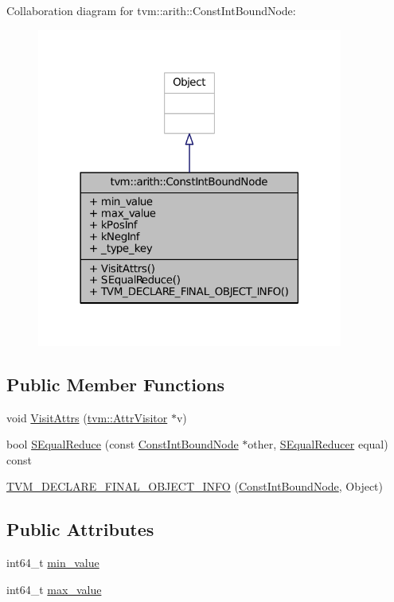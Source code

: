 Collaboration diagram for tvm\+:\+:arith\+:\+:Const\+Int\+Bound\+Node\+:
\nopagebreak
\begin{figure}[H]
\begin{center}
\leavevmode
\includegraphics[width=285pt]{classtvm_1_1arith_1_1ConstIntBoundNode__coll__graph}
\end{center}
\end{figure}
\subsection*{Public Member Functions}
\begin{DoxyCompactItemize}
\item 
void \hyperlink{classtvm_1_1arith_1_1ConstIntBoundNode_ac3b75966532b9fa16d96df991f33076f}{Visit\+Attrs} (\hyperlink{classtvm_1_1AttrVisitor}{tvm\+::\+Attr\+Visitor} $\ast$v)
\item 
bool \hyperlink{classtvm_1_1arith_1_1ConstIntBoundNode_a0d39b4e097e1e0e4fffd85d3d2b22459}{S\+Equal\+Reduce} (const \hyperlink{classtvm_1_1arith_1_1ConstIntBoundNode}{Const\+Int\+Bound\+Node} $\ast$other, \hyperlink{classtvm_1_1SEqualReducer}{S\+Equal\+Reducer} equal) const 
\item 
\hyperlink{classtvm_1_1arith_1_1ConstIntBoundNode_a79d78aaf1f1c3e974a3fbe4f4875e8ee}{T\+V\+M\+\_\+\+D\+E\+C\+L\+A\+R\+E\+\_\+\+F\+I\+N\+A\+L\+\_\+\+O\+B\+J\+E\+C\+T\+\_\+\+I\+N\+FO} (\hyperlink{classtvm_1_1arith_1_1ConstIntBoundNode}{Const\+Int\+Bound\+Node}, Object)
\end{DoxyCompactItemize}
\subsection*{Public Attributes}
\begin{DoxyCompactItemize}
\item 
int64\+\_\+t \hyperlink{classtvm_1_1arith_1_1ConstIntBoundNode_a0761897bf16ab73b848bf360e9b195a3}{min\+\_\+value}
\item 
int64\+\_\+t \hyperlink{classtvm_1_1arith_1_1ConstIntBoundNode_a7187224ffaf688dd1aa0f6069b393f92}{max\+\_\+value}
\end{DoxyCompactItemize}
